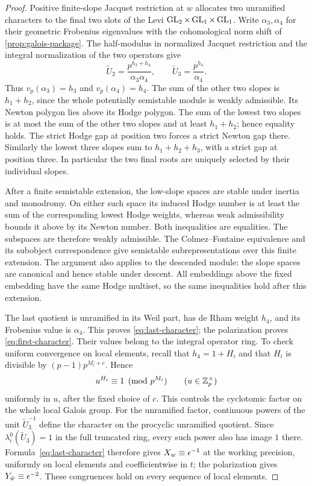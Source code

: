 \begin{proof}
Positive finite-slope Jacquet restriction at $w$
\citep[Section~4.1]{Casselman1995} allocates two
unramified characters to the final two slots of the Levi
$\operatorname{GL}_2\times\operatorname{GL}_1\times\operatorname{GL}_1$.  Write $\alpha_3,\alpha_4$ for their
geometric Frobenius eigenvalues with the cohomological norm shift of
\cref{prop:galois-package}.  The half-modulus in normalized Jacquet
restriction and the integral normalization of the two operators give
\begin{equation}
 \widetilde U_2=\frac{p^{h_3+h_4}}{\alpha_3\alpha_4},
 \qquad
 \widetilde U_3=\frac{p^{h_4}}{\alpha_4}.
 \label{eq:unit-root-formulas}
\end{equation}
Thus $v_p(\alpha_3)=h_3$ and $v_p(\alpha_4)=h_4$.  The sum of the
other two slopes is $h_1+h_2$, since the whole potentially semistable
module is weakly admissible.  Its Newton polygon lies above its Hodge
polygon.  The sum of the lowest two slopes is at most the sum of the
other two slopes and at least $h_1+h_2$; hence equality holds.
The strict Hodge gap at position two forces a strict Newton gap there.
Similarly the lowest three slopes sum to $h_1+h_2+h_3$, with a strict
gap at position three.  In particular the two final roots are
uniquely selected by their individual slopes.

After a finite semistable extension, the low-slope spaces are stable
under inertia and monodromy.  On either such space its induced Hodge
number is at least the sum of the corresponding lowest Hodge
weights, whereas weak admissibility bounds it above by its Newton
number.  Both inequalities are equalities.  The subspaces are
therefore weakly admissible.  The Colmez--Fontaine equivalence and
its subobject correspondence
\citep[Theorem~A, Proposition~4.2 and the corollary following
Theorem~4.3]{ColmezFontaine2000}
give semistable subrepresentations over this finite extension.
The argument
also applies to the descended module: the slope spaces are canonical
and hence stable under descent.  All embeddings above the fixed
embedding have the same Hodge multiset, so the same inequalities hold
after this extension.

The last quotient is unramified in its Weil part, has de Rham weight
$h_4$, and its Frobenius value is $\alpha_4$.  This proves
\cref{eq:last-character}; the polarization proves
\cref{eq:first-character}.  Their values belong to the integral
operator ring.  To check uniform convergence on local elements,
recall that $h_4=1+H_i$ and that $H_i$ is divisible by
$(p-1)p^{M_i+c}$.  Hence
\[
 u^{H_i}\equiv1\pmod{p^{M_i}}\qquad(u\in\mathbb Z_p^\times)
\]
uniformly in $u$, after the fixed choice of $c$.  This controls the
cyclotomic factor on the whole local Galois group.  For the unramified
factor, continuous powers of the unit $\widetilde U_3^{-1}$ define
the character on the procyclic unramified quotient.  Since
$\lambda_i^0(\widetilde U_3)=1$ in the full truncated ring, every
such power also has image $1$ there.  Formula~\eqref{eq:last-character}
therefore gives $X_w\equiv\epsilon^{-1}$ at the working precision,
uniformly on local elements and coefficientwise in $t$; the
polarization gives $Y_{\bar w}\equiv\epsilon^{-2}$.  These congruences
hold on every sequence of local elements.
\end{proof}


